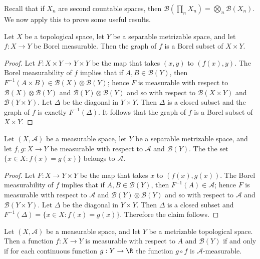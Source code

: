 Recall that if $X_n$ are second countable spaces, then $\mathcal{B}(\prod_nX_n)=\bigotimes_n\mathcal{B}(X_n)$. We now apply this to prove some useful results.
\begin{proposition}\label{measurable graph is Borel}
Let $X$ be a topological space, let $Y$ be a separable metrizable space, and let $f:X\to Y$ be Borel measurable. Then the graph of $f$ is a Borel subset of $X\times Y$.
\end{proposition}
\begin{proof}
Let $F:X\times Y\to Y\times Y$ be the map that takes $(x,y)$ to $(f(x),y)$. The Borel measurability of $f$ implies that if $A,B\in\mathcal{B}(Y)$, then $F^{-1}(A\times B)\in\mathcal{B}(X)\otimes\mathcal{B}(Y)$; hence $F$ is measurable with respect to $\mathcal{B}(X)\otimes\mathcal{B}(Y)$ and $\mathcal{B}(Y)\otimes\mathcal{B}(Y)$ and so with respect to $\mathcal{B}(X\times Y)$ and $\mathcal{B}(Y\times Y)$. Let $\Delta$ be the diagonal in $Y\times Y$. Then $\Delta$ is a closed subset and the graph of $f$ is exactly $F^{-1}(\Delta)$. It follows that the graph of $f$ is a Borel subset of $X\times Y$.
\end{proof}
\begin{proposition}\label{measurable equal set is measurable}
Let $(X,\mathcal{A})$ be a measurable space, let $Y$ be a separable metrizable space, and let $f,g:X\to Y$ be measurable with respect to $\mathcal{A}$ and $\mathcal{B}(Y)$. The the set $\{x\in X:f(x)=g(x)\}$ belongs to $\mathcal{A}$.
\end{proposition}
\begin{proof}
Let $F:X\to Y\times Y$ be the map that takes $x$ to $(f(x),g(x))$. The Borel measurability of $f$ implies that if $A,B\in\mathcal{B}(Y)$, then $F^{-1}(A)\in\mathcal{A}$; hence $F$ is measurable with respect to $\mathcal{A}$ and $\mathcal{B}(Y)\otimes\mathcal{B}(Y)$ and so with respect to $\mathcal{A}$ and $\mathcal{B}(Y\times Y)$. Let $\Delta$ be the diagonal in $Y\times Y$. Then $\Delta$ is a closed subset and $F^{-1}(\Delta)=\{x\in X:f(x)=g(x)\}$. Therefore the claim follows.
\end{proof}
\begin{lemma}\label{metric space measurable iff composition with continuous}
Let $(X,\mathcal{A})$ be a measurable space, and let $Y$ be a metrizable topological space. Then a function $f:X\to Y$ is measurable with respect to $A$ and $\mathcal{B}(Y)$ if and only if for each continuous function $g:Y\to\R$ the function $g\circ f$ is $\mathcal{A}$-measurable.
\end{lemma}
